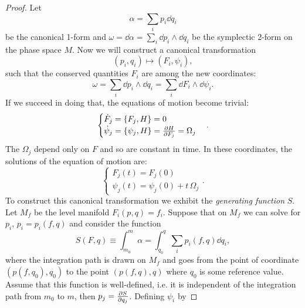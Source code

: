 \begin{proof}
    Let 
    \begin{equation} \label{eq:def_alpha}
        \alpha = \sum_i p_i \dd{q_i}
    \end{equation}
    be the canonical 1-form and $\omega = \dd{\alpha} =\sum_i \dd{p_i} \wedge \dd{q_i}$ be the symplectic 2-form on the phase space $M$. Now we will construct a canonical transformation
    \begin{equation}
        (p_i,q_i) \mapsto (F_i, \psi_i),
    \end{equation}
    such that the conserved quantities $F_i$ are among the new coordinates:
    \begin{equation}
        \omega = \sum_i \dd{p_i} \wedge \dd{q_i} = \sum_i \dd{F_i} \wedge \dd{\psi_i}.
    \end{equation}
    If we succeed in doing that, the equations of motion become trivial:
    \begin{equation}
        \begin{cases}
            \dot{F}_j = \{F_j, H\} = 0 \\
            \dot{\psi}_j = \{\psi_j, H \} = \pdv{H}{F_j} = \Omega_j
        \end{cases}.
    \end{equation}
    The $\Omega_j$ depend only on $F$ and so are constant in time. In these coordinates, the solutions of the equation of motion are:
    \begin{equation}
        \begin{cases}
            F_j(t) = F_j(0) \\
            \psi_j(t) = \psi_j(0) + t \, \Omega_j
        \end{cases}.
    \end{equation}
    To construct this canonical transformation we exhibit the \textit{generating function} $S$. Let $M_f$ be the level manifold $F_i(p,q) = f_i$. Suppose that on $M_f$ we can solve for $p_i$, $p_i = p_i(f,q)$ and consider the function
    \begin{equation}
        S(F,q) \equiv \int_{m_0}^{m} \alpha = \int_{q_0}^{q} \sum_i p_i(f,q) \dd{q_i},
    \end{equation}
    where the integration path is drawn on $M_f$ and goes from the point of coordinate $(p(f,q_0),q_0)$ to the point $(p(f,q),q)$ where $q_0$ is some reference value.
    Assume that this function is well-defined, i.e. it is independent of the integration path from $m_0$ to $m$, then $p_j = \pdv{S}{q_j}$.
    Defining $\psi_i$ by

\end{proof}
